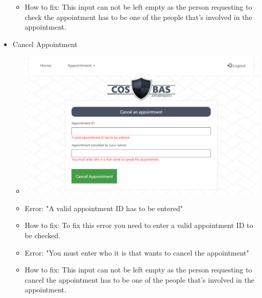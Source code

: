 \begin{itemize}
\begin{itemize}
				\item How to fix: This input can not be left empty as the person requesting to check the appointment has to be one of the people that's involved in the appointment.
			\end{itemize}
		\item Cancel Appointment
			\begin{itemize}
				\item \includegraphics[width=\linewidth]{images/Screenshots/CancelAppoint_Error.png}
				\item Error: "A valid appointment ID has to be entered"
				\item How to fix: To fix this error you need to enter a valid appointment ID to be checked. 
				\item Error: "You must enter who it is that wants to cancel the appointment"
				\item How to fix: This input can not be left empty as the person requesting to cancel the appointment has to be one of the people that's involved in the appointment.
			\end{itemize}
	\end{itemize}